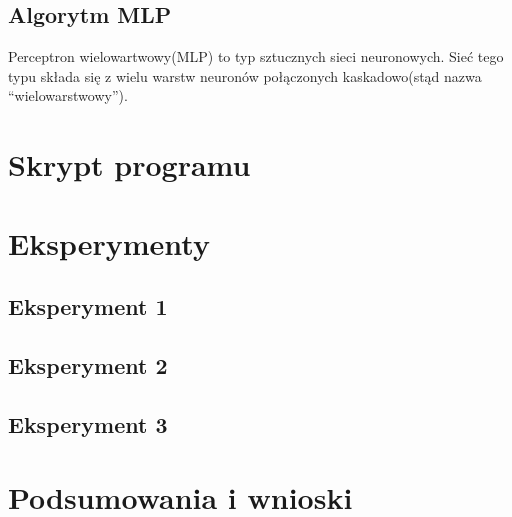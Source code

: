 \documentclass[a4paper, 10pt]{article}
\begin{document}
\subsection{Algorytm MLP}

Perceptron wielowartwowy(MLP) to typ sztucznych sieci neuronowych. Sieć tego typu składa się z wielu warstw neuronów połączonych kaskadowo(stąd nazwa ``wielowarstwowy'').

\section{Skrypt programu}

\section{Eksperymenty}
\subsection{Eksperyment 1}
\subsection{Eksperyment 2}
\subsection{Eksperyment 3}

\section{Podsumowania i wnioski}
\end{document}
